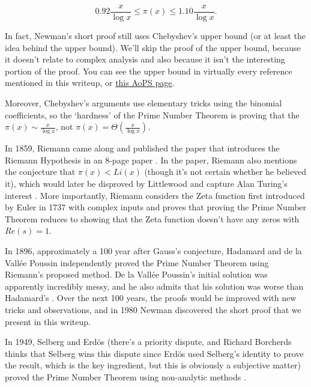 \documentclass{article}
\theoremstyle{definition}
\begin{document}
\[ 0.92 \frac{x}{\log x} \leq \pi(x) \leq 1.10 \frac{x}{\log x}. \]

In fact, Newman's short proof \cite{zagier_newmans_1997} still uses Chebyshev's upper bound
(or at least the idea behind the upper bound). We'll skip the proof of the upper bound, because
it doesn't relate to complex analysis and also because it isn't the interesting portion of the proof.
You can see the upper bound in virtually every reference mentioned in this writeup, or \href{https://artofproblemsolving.com/wiki/index.php/Chebyshev_theta_function#Estimates_of_the_function}
{this AoPS page}.

Moreover, Chebyshev's arguments use elementary tricks using the binomial coefficients,
so the `hardness' of the Prime Number Theorem is proving that the $ \pi(x) \sim \frac{x}{\log x} $,
not $ \pi(x) = \Theta(\frac{x}{\log x}) $.

In 1859, Riemann came along and published the paper that introduces the
Riemann Hypothesis in an 8-page paper \cite{wilkins_number_1998}. In the paper, Riemann also
mentions the conjecture that $ \pi(x) < Li(x) $ (though it's not certain whether he believed it), which would later
be disproved by Littlewood and capture Alan Turing's interest \cite{princetonacademics_andrew_2012} \cite{matiyasevich_riemann_2020} \cite{hejhal_alan_2012}. More importantly,
Riemann considers the Zeta function first introduced by Euler in 1737 
with complex inputs and proves that proving the Prime Number Theorem
reduces to showing that the Zeta function doesn't have any zeros with $ Re(s) = 1 $.

In 1896, approximately a 100 year after Gauss's conjecture, Hadamard and de la Vallée Poussin
independently proved the Prime Number Theorem using Riemann's proposed method. De la Vallée Poussin's
initial solution was apparently incredibly messy, and he also admits that his solution was worse than
Hadamard's \cite{bambah_centennial_2000}. Over the next 100 years, the proofs would be improved with new tricks and observations, 
and in 1980 Newman discovered the short proof that we present in this writeup.

In 1949, Selberg and Erdös (there's a priority dispute, and Richard Borcherds thinks
that Selberg wins this dispute since Erdös used Selberg's identity to prove the result, which is the
key ingredient, but this is obviously a subjective matter) proved the Prime Number Theorem using non-analytic methods \cite{bambah_centennial_2000} \cite{richard_e_borcherds_introduction_2022}.
\end{document}

